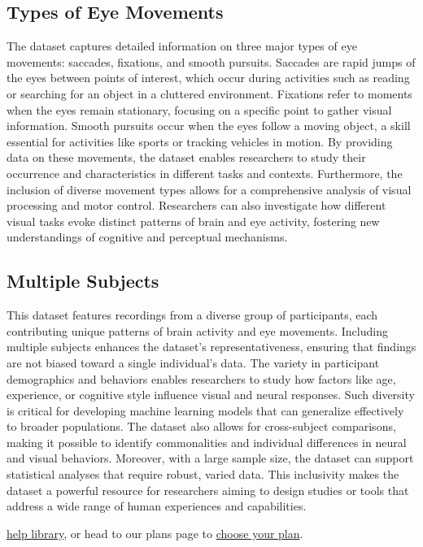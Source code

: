 \documentclass{article}
\begin{document}
\subsection{Types of Eye Movements}
The dataset captures detailed information on three major types of eye movements: saccades, fixations, and smooth pursuits. Saccades are rapid jumps of the eyes between points of interest, which occur during activities such as reading or searching for an object in a cluttered environment. Fixations refer to moments when the eyes remain stationary, focusing on a specific point to gather visual information. Smooth pursuits occur when the eyes follow a moving object, a skill essential for activities like sports or tracking vehicles in motion. By providing data on these movements, the dataset enables researchers to study their occurrence and characteristics in different tasks and contexts. Furthermore, the inclusion of diverse movement types allows for a comprehensive analysis of visual processing and motor control. Researchers can also investigate how different visual tasks evoke distinct patterns of brain and eye activity, fostering new understandings of cognitive and perceptual mechanisms.

\subsection{Multiple Subjects}
This dataset features recordings from a diverse group of participants, each contributing unique patterns of brain activity and eye movements. Including multiple subjects enhances the dataset’s representativeness, ensuring that findings are not biased toward a single individual's data. The variety in participant demographics and behaviors enables researchers to study how factors like age, experience, or cognitive style influence visual and neural responses. Such diversity is critical for developing machine learning models that can generalize effectively to broader populations. The dataset also allows for cross-subject comparisons, making it possible to identify commonalities and individual differences in neural and visual behaviors. Moreover, with a large sample size, the dataset can support statistical analyses that require robust, varied data. This inclusivity makes the dataset a powerful resource for researchers aiming to design studies or tools that address a wide range of human experiences and capabilities.




\href{https://www.overleaf.com/learn}{help library}, or head to our plans page to \href{https://www.overleaf.com/user/subscription/plans}{choose your plan}.
\end{document}
